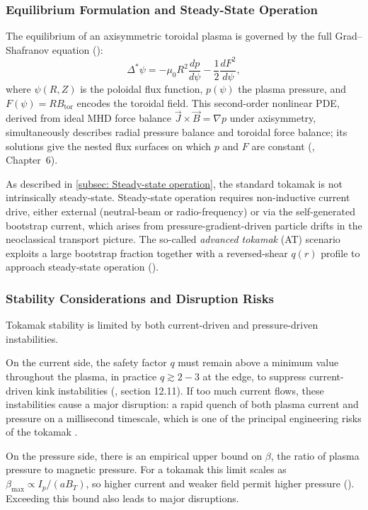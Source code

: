 \subsubsection{Equilibrium Formulation and Steady-State Operation}

The equilibrium of an axisymmetric toroidal plasma is governed by the full
Grad--Shafranov equation (\cite{Freidberg2014}):
\begin{equation}
    \Delta^* \psi = -\mu_0 R^2 \frac{dp}{d\psi} - \frac{1}{2}\frac{dF^2}{d\psi},
    \label{eq:GS}
\end{equation}
where $\psi(R,Z)$ is the poloidal flux function, $p(\psi)$ the plasma pressure,
and $F(\psi)=RB_\text{tor}$ encodes the toroidal field.
This second-order nonlinear PDE, derived from ideal MHD force balance
$\vec{J}\times\vec{B}=\nabla p$ under axisymmetry, simultaneously describes
radial pressure balance and toroidal force balance; its solutions give the nested
flux surfaces on which $p$ and $F$ are constant
(\cite{Freidberg2014}, Chapter~6).

As described in \autoref{subsec: Steady-state operation}, the standard tokamak is not intrinsically steady-state.
Steady-state operation requires non-inductive current drive, either external
(neutral-beam or radio-frequency) or via the self-generated bootstrap current,
which arises from pressure-gradient-driven particle drifts in the
neoclassical transport picture. The so-called \emph{advanced tokamak} (AT) scenario exploits a large bootstrap
fraction together with a reversed-shear $q(r)$ profile to approach steady-state
operation (\cite{Freidberg2014}).


\subsubsection{Stability Considerations and Disruption Risks}

Tokamak stability is limited by both current-driven and pressure-driven
instabilities.

On the current side, the safety factor $q$ must remain above a minimum
value throughout the plasma, in practice $q\gtrsim 2-3$ at the edge, to
suppress current-driven kink instabilities (\cite{Freidberg2014}, section 12.11).
If too much current flows, these instabilities cause a major disruption:
a rapid quench of both plasma current and pressure on a millisecond timescale,
which is one of the principal engineering risks of the tokamak
\cite{Freidberg2014}.

On the pressure side, there is an empirical upper bound on $\beta$, the ratio
of plasma pressure to magnetic pressure.
For a tokamak this limit scales as $\beta_\text{max} \propto I_p / (a B_T)$,
so higher current and weaker field permit higher pressure (\cite{Freidberg2014}).
Exceeding this bound also leads to major disruptions.


